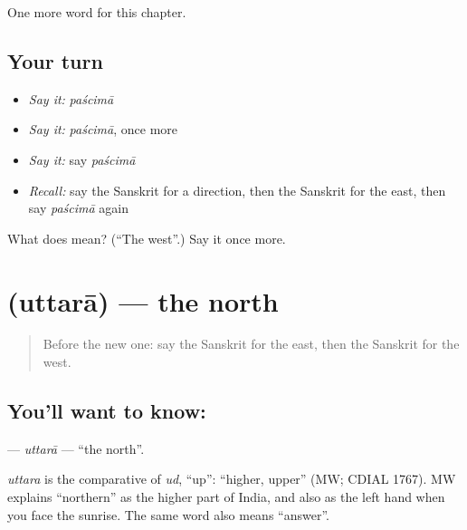 \begin{grammarlens}[title={What you've built}]
One more word for this chapter.
\end{grammarlens}

\subsection*{Your turn}
\begin{itemize}
\raggedright
  \item \emph{Say it:} \emph{paścimā}
  \item \emph{Say it:} \emph{paścimā}, once more
  \item \emph{Say it:} say \emph{paścimā}
  \item \emph{Recall:} say the Sanskrit for a direction, then the Sanskrit for the east, then say \emph{paścimā} again
\end{itemize}

\begin{tcolorbox}[breakable,colback=teal!4,colframe=teal!35!black,title={Before you move on}]
What does  mean? (\textquotedblleft{}The west\textquotedblright{}.) Say it once more.
\end{tcolorbox}
\section[\texorpdfstring{\sk{उत्तरा} (uttarā)}{उत्तरा (uttarā)}]{ (uttarā) — the north}

\label{lesson:SA-C202-uttara}



\begin{quote}
Before the new one: say the Sanskrit for the east, then the Sanskrit for the west.
\end{quote}

\subsection*{You'll want to know: }
\textbf{} — \emph{uttarā} — \textquotedblleft{}the north\textquotedblright{}.

\begin{cousinweb}
\emph{uttara} is the comparative of \emph{ud}, \textquotedblleft{}up\textquotedblright{}: \textquotedblleft{}higher, upper\textquotedblright{} (MW; CDIAL 1767). MW explains \textquotedblleft{}northern\textquotedblright{} as the higher part of India, and also as the left hand when you face the sunrise. The same word also means \textquotedblleft{}answer\textquotedblright{}.
\end{cousinweb}

